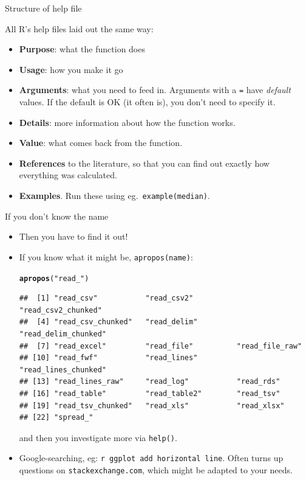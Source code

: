 \documentclass[unknownkeysallowed]{beamer}\usepackage[]{graphicx}\usepackage[]{color}
\makeatletter
\newcommand{\hlstr}[1]{\textcolor[rgb]{0.192,0.494,0.8}{#1}}%
\newcommand{\hlstd}[1]{\textcolor[rgb]{0.345,0.345,0.345}{#1}}%
\newcommand{\hlkwd}[1]{\textcolor[rgb]{0.737,0.353,0.396}{\textbf{#1}}}%
\newenvironment{kframe}{%
 \def\at@end@of@kframe{}%
 \ifinner\ifhmode%
  \def\at@end@of@kframe{\end{minipage}}%
  \begin{minipage}{\columnwidth}%
 \fi\fi%
 \def\FrameCommand##1{\hskip\@totalleftmargin \hskip-\fboxsep
 \colorbox{shadecolor}{##1}\hskip-\fboxsep
     \hskip-\linewidth \hskip-\@totalleftmargin \hskip\columnwidth}%
 \MakeFramed {\advance\hsize-\width
   \@totalleftmargin\z@ \linewidth\hsize
   \@setminipage}}%
 {\par\unskip\endMakeFramed%
 \at@end@of@kframe}
\newenvironment{knitrout}{}{} %
\makeatother
\begin{document}
\begin{frame}[fragile]{Structure of help file}

All R's help files laid out the same way:

\begin{itemize}
\item \textbf{Purpose}: what the function does
\item \textbf{Usage}: how you make it go
\item \textbf{Arguments}: what you need to feed in. Arguments with a \texttt{=}
  have \emph{default} values. If the default is OK (it often is), you
  don't need to specify it.
\item \textbf{Details}: more information about how the function works.
\item \textbf{Value}: what comes back from the function.
\item \textbf{References} to the literature, so that you can find out exactly
  how everything was calculated.
\item \textbf{Examples}. Run these using eg.\ \texttt{example(median)}.
  
\end{itemize}

\end{frame}

\begin{frame}[fragile]{If you don't know the name}
  
  \begin{itemize}
  \item Then you have to find it out!
  \item If you know what it might be, \texttt{apropos(name)}:

    \begin{small}
\begin{knitrout}
\color{fgcolor}\begin{kframe}
\begin{alltt}
\hlkwd{apropos}\hlstd{(}\hlstr{"read_"}\hlstd{)}
\end{alltt}
\begin{verbatim}
##  [1] "read_csv"           "read_csv2"          "read_csv2_chunked" 
##  [4] "read_csv_chunked"   "read_delim"         "read_delim_chunked"
##  [7] "read_excel"         "read_file"          "read_file_raw"     
## [10] "read_fwf"           "read_lines"         "read_lines_chunked"
## [13] "read_lines_raw"     "read_log"           "read_rds"          
## [16] "read_table"         "read_table2"        "read_tsv"          
## [19] "read_tsv_chunked"   "read_xls"           "read_xlsx"         
## [22] "spread_"
\end{verbatim}
\end{kframe}
\end{knitrout}
    \end{small}
and then you investigate more via \texttt{help()}.
\item Google-searching, eg: \texttt{r ggplot add horizontal
    line}. Often turns up questions on \texttt{stackexchange.com},
  which might be adapted to your needs.
  \end{itemize}
  
\end{frame}
\end{document}
